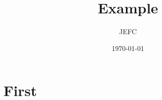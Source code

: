 \documentclass{beamer}
\title{Example}
\date{\today}
\author{JEFC}
\institute{Tufts University}
\begin{document}
  \maketitle
  \section{First}
  \begin{frame}

  \end{frame}
\end{document}
